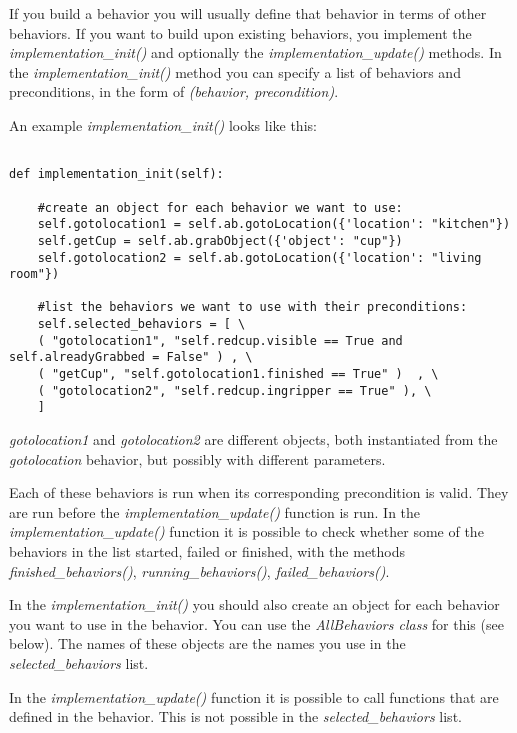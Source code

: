 \documentclass[a4paper, 10pt, oneside]{article}
\newcommand{\cod}[1]{\emph{#1}}
\begin{document}
If you build a behavior you will usually define that behavior in terms of other behaviors. If you
want to build upon existing behaviors, you implement the \cod{implementation\_init()} and optionally
the \cod{implementation\_update()} methods. In the \cod{implementation\_init()} method you can
specify a list of behaviors and preconditions, in the form of \cod{(behavior, precondition)}.

An example \cod{implementation\_init()} looks like this:

\begin{verbatim}

def implementation_init(self):

    #create an object for each behavior we want to use:
    self.gotolocation1 = self.ab.gotoLocation({'location': "kitchen"})
    self.getCup = self.ab.grabObject({'object': "cup"})
    self.gotolocation2 = self.ab.gotoLocation({'location': "living room"})

    #list the behaviors we want to use with their preconditions:
    self.selected_behaviors = [ \
    ( "gotolocation1", "self.redcup.visible == True and self.alreadyGrabbed = False" ) , \
    ( "getCup", "self.gotolocation1.finished == True" )  , \
    ( "gotolocation2", "self.redcup.ingripper == True" ), \
    ]  

\end{verbatim}

\cod{gotolocation1} and \cod{gotolocation2} are different objects, both instantiated from the
\cod{gotolocation} behavior, but possibly with different parameters.

Each of these behaviors is run when its corresponding precondition is valid. They are run before the
\cod{implementation\_update()} function is run. In the \cod{implementation\_update()} function it is
possible to check whether some of the behaviors in the list started, failed or finished, with the
methods \cod{finished\_behaviors()}, \cod{running\_behaviors()}, \cod{failed\_behaviors()}.

In the \cod{implementation\_init()} you should also create an object for each behavior you want to
use in the behavior. You can use the \cod{AllBehaviors class} for this (see below). The names of
these objects are the names you use in the \cod{selected\_behaviors} list.

In the \cod{implementation\_update()} function it is possible to call functions that are defined in
the behavior. This is not possible in the \cod{selected\_behaviors} list.
\end{document}
